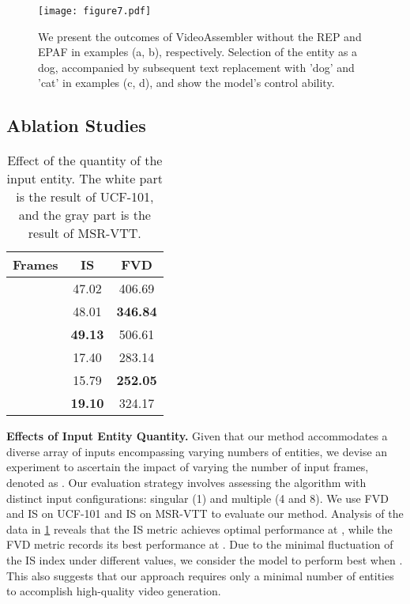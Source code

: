 \begin{figure*}[ht]
\centering
\texttt{[image: figure7.pdf]}
\caption{We present the outcomes of VideoAssembler without the REP and EPAF in examples (a, b), respectively. 
Selection of the entity as a dog, accompanied by subsequent text replacement with 'dog' and 'cat' in examples (c, d), and show the model's control ability.
}
\label{fig: ablation}
\end{figure*}

\subsection{Ablation Studies}

\begin{table}[ht]
    \setlength{\tabcolsep}{8.0mm}
    \centering
    \begin{tabular}{lcc}
       \toprule
       Frames &  IS  & FVD  \\
       \midrule
        & 47.02 & 406.69 \\
        & 48.01 & \textbf{346.84} \\
        & \textbf{49.13} & 506.61 \\
       \midrule
       \rowcolor{gray!20}
        & 17.40 & 283.14 \\
       \rowcolor{gray!20}
        & 15.79 & \textbf{252.05} \\
       \rowcolor{gray!20}
        & \textbf{19.10} & 324.17 \\
       \bottomrule
    \end{tabular}
    \caption{Effect of the quantity of the input entity. The white part is the result of UCF-101, and the gray part is the result of MSR-VTT.}
    \label{tab:quantity-effect}
\end{table}

\noindent
\textbf{Effects of Input Entity Quantity.} 
Given that our method accommodates a diverse array of inputs encompassing varying numbers of entities, we devise an experiment to ascertain the impact of varying the number of input frames, denoted as . Our evaluation strategy involves assessing the algorithm with distinct input configurations: singular (1) and multiple (4 and 8). We use FVD and IS on UCF-101 and IS on MSR-VTT to evaluate our method. Analysis of the data in \cref{tab:quantity-effect} reveals that the IS metric achieves optimal performance at , while the FVD metric records its best performance at . Due to the minimal fluctuation of the IS index under different  values, we consider the model to perform best when . This also suggests that our approach requires only a minimal number of entities to accomplish high-quality video generation.


